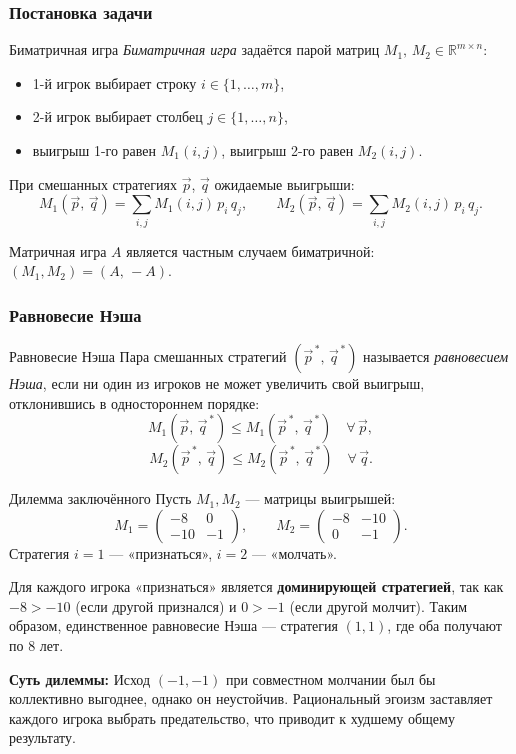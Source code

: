 \subsubsection*{Постановка задачи}

\begin{Definition}{Биматричная игра}{}
	\emph{Биматричная игра} задаётся парой матриц $M_1,\, M_2 \in \mathbb{R}^{m \times n}$:
	\begin{itemize}
		\item 1-й игрок выбирает строку $i \in \{1,\ldots, m\}$,
		\item 2-й игрок выбирает столбец $j \in \{1,\ldots, n\}$,
		\item выигрыш 1-го равен $M_1(i, j)$, выигрыш 2-го равен $M_2(i, j)$.
	\end{itemize}
	При смешанных стратегиях $\vec{p}$, $\vec{q}$ ожидаемые выигрыши:
	\[
	M_1(\vec{p},\,\vec{q}) = \sum_{i,j} M_1(i,j)\, p_i\, q_j, \qquad
	M_2(\vec{p},\,\vec{q}) = \sum_{i,j} M_2(i,j)\, p_i\, q_j.
	\]
\end{Definition}

\begin{Remark}{}{}
	Матричная игра $A$ является частным случаем биматричной: $(M_1, M_2) = (A,\,-A)$.
\end{Remark}

\subsubsection*{Равновесие Нэша}

\begin{Definition}{Равновесие Нэша}{}
	Пара смешанных стратегий $(\vec{p}^{\,*},\, \vec{q}^{\,*})$ называется \emph{равновесием Нэша}, если ни один из игроков не может увеличить свой выигрыш, отклонившись в одностороннем порядке:
	\[
	M_1(\vec{p},\, \vec{q}^{\,*}) \leq M_1(\vec{p}^{\,*},\, \vec{q}^{\,*}) \quad \forall\, \vec{p},
	\]
	\[
	M_2(\vec{p}^{\,*},\, \vec{q}) \leq M_2(\vec{p}^{\,*},\, \vec{q}^{\,*}) \quad \forall\, \vec{q}.
	\]
\end{Definition}

\begin{Example}{Дилемма заключённого}{}
	Пусть $M_1, M_2$ — матрицы выигрышей:
	\[
	M_1 = \begin{pmatrix} -8 & 0 \\ -10 & -1 \end{pmatrix}, \qquad
	M_2 = \begin{pmatrix} -8 & -10 \\ 0 & -1 \end{pmatrix}.
	\]
	Стратегия $i=1$ — «признаться», $i=2$ — «молчать».
	
	Для каждого игрока «признаться» является \textbf{доминирующей стратегией}, так как $-8 > -10$ (если другой признался) и $0 > -1$ (если другой молчит). Таким образом, единственное равновесие Нэша — стратегия $(1, 1)$, где оба получают по 8 лет.
	
	\textbf{Суть дилеммы:} Исход $(-1, -1)$ при совместном молчании был бы коллективно выгоднее, однако он неустойчив. Рациональный эгоизм заставляет каждого игрока выбрать предательство, что приводит к худшему общему результату.
\end{Example}


